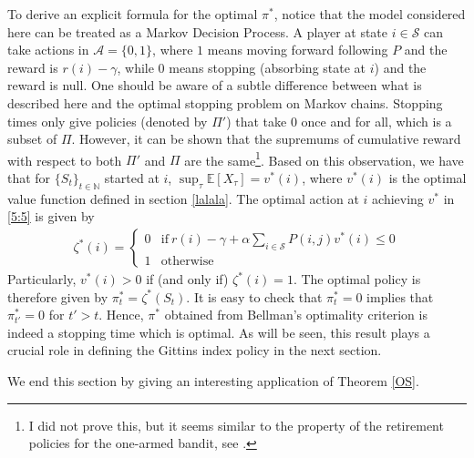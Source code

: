 \documentclass[letterpaper,11pt,openright,openany]{book}
\numberwithin{equation}{section}
\theoremstyle{plain}
\theoremstyle{definition}
\def\N{{\mathbb N}}
\def\E{{\mathbb E}}
\def\S{{\mathcal S}}
\def\A{{\mathcal A}}
\begin{document}
To derive an explicit formula for the optimal $\pi^*$, notice that the model considered here can be treated as a Markov Decision Process. 
A player at state $i\in\S$ can take actions in $\A = \{0,1\}$, where $1$ means moving forward following $P$ and the reward is $r(i)-\gamma$, while $0$ means stopping (absorbing state at $i$) and the reward is null. 
One should be aware of a subtle difference between what is described here and the optimal stopping problem on Markov chains. 
Stopping times only give policies (denoted by $\Pi'$) that take $0$ once and for all, which is a subset of $\Pi$.   
However, it can be shown that the supremums of cumulative reward with respect to both $\Pi'$ and $\Pi$ are the same\footnote{I did not prove this, but it seems similar to the property of the retirement policies for the one-armed bandit, see \cite{lattimore2018bandit}.}. 
Based on this observation, we have that for $\{S_t\}_{t\in\N}$ started at $i$, $\sup_{\tau}\E[X_\tau]=v^*(i)$, where $v^*(i)$ is the optimal value function defined in section \ref{lalala}. 
The optimal action at $i$ achieving $v^*$ in \eqref{5:5} is given by
\begin{align}\label{gittins}
\zeta^*(i) = \begin{cases} 
      0 & \text{if}\  r(i)-\gamma+\alpha\sum_{i\in\S}P(i, j)v^*(i)\leq 0 \\
     1 & \text{otherwise}
         \end{cases}
\end{align} 
Particularly, $v^*(i)> 0$ if (and only if) $\zeta^*(i)=1$.
The optimal policy is therefore given by $\pi^*_t = \zeta^*(S_t)$.  
It is easy to check that $\pi^*_{t}=0$ implies that $\pi^*_{t'}=0$ for $t'>t$. Hence, $\pi^*$ obtained from Bellman's optimality criterion is indeed a stopping time which is optimal. 
As will be seen, this result plays a crucial role in defining the Gittins index policy in the next section.

We end this section by giving an interesting application of Theorem \ref{OS}. 
\end{document}
